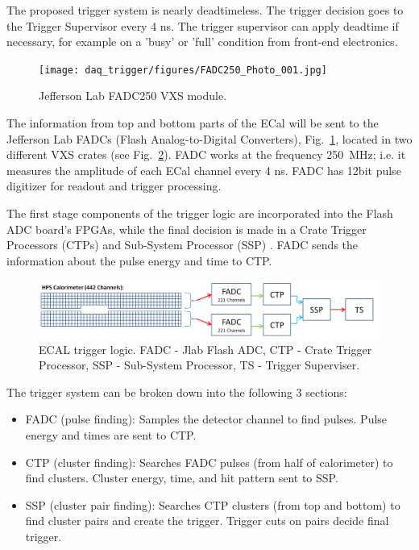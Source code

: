 


The proposed trigger system is nearly deadtimeless. The trigger decision goes to the Trigger Supervisor every 4 ns. The trigger supervisor can apply deadtime if necessary, for example on a 'busy' or 'full' condition from front-end electronics.


\begin{figure}[t]
\texttt{[image: daq\_trigger/figures/FADC250\_Photo\_001.jpg]}
\caption{\small{Jefferson Lab FADC250 VXS module.}}
\label{fig:fadc}
\end{figure}

The information from top and bottom parts of the ECal will be sent to the Jefferson Lab FADCs (Flash Analog-to-Digital Converters), Fig.~\ref{fig:fadc},  located in two different VXS crates (see Fig.~\ref{fig:hps_trigger_cal}). FADC  works at the frequency 250~MHz; i.e. it measures the amplitude of each ECal channel every 4 ns. FADC has 12bit pulse digitizer for readout and trigger processing. 

The first stage components of the trigger logic are incorporated into the Flash ADC board's FPGAs, while the final decision is made in a Crate Trigger Processors (CTPs) and  Sub-System Processor (SSP) .
FADC sends the information about the pulse energy and time to CTP.


\begin{figure}[t]
\includegraphics[scale=0.25]{daq_trigger/figures/hps_trigger_cal}
\caption{\small{ECAL trigger logic. FADC - Jlab Flash ADC, CTP - Crate Trigger Processor, SSP - Sub-System Processor, TS - Trigger Superviser.}}
\label{fig:hps_trigger_cal}
\end{figure}

The trigger system can be broken down into the following 3 sections:
 \begin{itemize}
 \item FADC (pulse finding): Samples the detector channel to find pulses. Pulse energy and times are sent to CTP.
 \item CTP (cluster finding): Searches FADC pulses (from half of calorimeter) to find clusters. Cluster energy, time, and hit pattern sent to SSP.
 \item SSP (cluster pair finding): Searches CTP clusters (from top and bottom) to find cluster pairs and create the trigger. Trigger cuts on pairs decide final trigger.
 \end{itemize}
 
